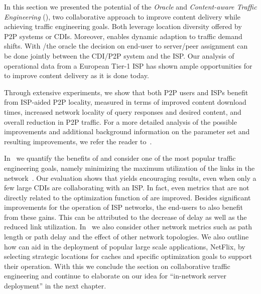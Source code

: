 In this section we presented the potential of the \emph{Oracle} and
\emph{Content-aware Traffic Engineering} (\cate), two collaborative approach to
improve content delivery while achieving traffic engineering goals.  Both
leverage location diversity offered by P2P systems or CDIs. Moreover, \cate
enables dynamic adaption to traffic demand shifts. With \cate/the oracle the
decision on end-user to server/peer assignment can be done jointly between the
CDI/P2P system and the ISP.  Our analysis of operational data from a European
Tier-1 ISP has shown ample opportunities for \cate to improve content delivery
as it is done today.

Through extensive experiments, we show that both P2P users and ISPs benefit
from ISP-aided P2P locality, measured in terms of improved content download
times, increased network locality of query responses and desired content, and
overall reduction in P2P traffic. For a more detailed analysis of the possible
improvements and additional background information on the parameter set and
resulting improvements, we refer the reader to~\cite{afs-cispp2pcip-ccr07,A-IANSPS-08}.

In~\cite{Cate-CCR, CaTE-TR, Sigmetrics2012} we quantify the benefits of \cate
and consider one of the most popular traffic engineering goals, namely
minimizing the maximum utilization of the links in the
network~\cite{FT00,FT01}.  Our evaluation shows that \cate yields encouraging
results, even when only a few large CDIs are collaborating with an ISP. In fact,
even metrics that are not directly related to the optimization function of
\cate are improved. Besides significant improvements for the operation of ISP
networks, the end-users to also benefit from these gains. This can be
attributed to the decrease of delay as well as the reduced link
utilization. In~\cite{CaTE-TR} we also consider other network metrics such as
path length or path delay and the effect of other network topologies.  We also
outline how \cate can aid in the deployment of popular large scale
applications, \eg NetFlix, by selecting strategic locations for caches and
specific optimization goals to support their operation. With this we conclude
the section on collaborative traffic engineering and continue to elaborate on
our idea for ``in-network server deployment'' in the next chapter.

